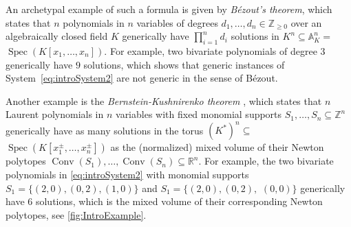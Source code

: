\documentclass[12pt,reqno,a4paper]{amsart}
\theoremstyle{theoremstyle}
\theoremstyle{examplestyle}
\theoremstyle{algorithmstyle}
\newcommand{\RR}{\mathbb{R}}
\newcommand{\ZZ}{\mathbb{Z}}
\DeclareMathOperator{\Conv}{Conv}
\DeclareMathOperator{\Spec}{Spec}
\begin{document}
An archetypal example of such a formula is given by \emph{B\'{e}zout's theorem}, which states that $n$ polynomials in $n$ variables of degrees $d_{1},\dots,d_{n}\in\ZZ_{\geq 0}$ over an algebraically closed field $K$ generically have $\prod_{i=1}^n d_{i}$ solutions in $K^{n}\subseteq \mathbb{A}^{n}_{K}=$ \linebreak $\Spec(K[x_{1},\dots,x_{n}])$.  For example, two bivariate polynomials of degree $3$ generically have $9$ solutions, which shows that generic instances of System~\eqref{eq:introSystem2} are not generic in the sense of B\'ezout.

Another example is the \emph{Bernstein-Kushnirenko theorem} \cite{Bernstein1975,Kushnirenko1976}, which states that $n$ Laurent polynomials in $n$ variables with fixed monomial supports $S_{1}, \dots, S_{n}\subseteq \mathbb{Z}^{n}$ generically have as many solutions in the torus $(K^\ast)^n\subseteq $\linebreak $\Spec(K[x_{1}^{\pm},\dots,x_{n}^{\pm}])$ as the (normalized) mixed volume of their Newton polytopes $\Conv(S_1), \dots, \Conv(S_n)\subseteq\RR^n$.  For example, the two bivariate polynomials in \cref{eq:introSystem2} with monomial supports $S_1=\{(2,0),(0,2),(1,0)\}$ and $S_1=\{(2,0), (0,2),$ $(0,0)\}$ generically have $6$ solutions, which is the mixed volume of their corresponding Newton polytopes, see \cref{fig:IntroExample}.
\end{document}
